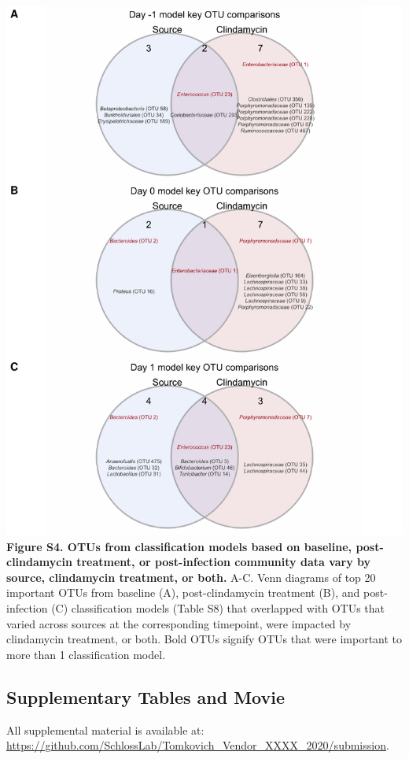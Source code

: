 \documentclass[11pt,]{article}
\begin{document}
\includegraphics{figure_S4.pdf} \textbf{Figure S4. OTUs from
classification models based on baseline, post-clindamycin treatment, or
post-infection community data vary by source, clindamycin treatment, or
both.} A-C. Venn diagrams of top 20 important OTUs from baseline (A),
post-clindamycin treatment (B), and post-infection (C) classification
models (Table S8) that overlapped with OTUs that varied across sources
at the corresponding timepoint, were impacted by clindamycin treatment,
or both. Bold OTUs signify OTUs that were important to more than 1
classification model.

\newpage

\subsection{Supplementary Tables and
Movie}\label{supplementary-tables-and-movie}

All supplemental material is available at:
\url{https://github.com/SchlossLab/Tomkovich_Vendor_XXXX_2020/submission}.
\end{document}
